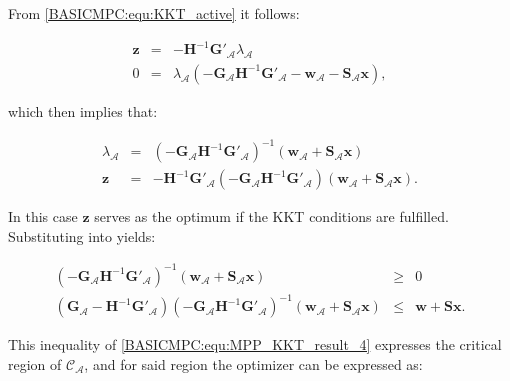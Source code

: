     From \ref{BASICMPC:equ:KKT_active} it follows:

    \begin{equation}
    \begin{array}{rcl}
            \textbf{z}&=&-\textbf{H}^{-1}\textbf{G}'_{\mathcal{A}}\lambda_{\mathcal{A}}\\
            0&=&\lambda_{\mathcal{A}}(-\textbf{G}_{\mathcal{A}}\textbf{H}^{-1}\textbf{G}'_{\mathcal{A}}-\textbf{w}_{\mathcal{A}}-\textbf{S}_{\mathcal{A}}\textbf{x}),
        \end{array}
        \label{BASICMPC:equ:MPP_KKT_result_2}
    \end{equation}

    which then implies that:

    \begin{equation}
    \begin{array}{rcl}
            \lambda_{\mathcal{A}}&=&(-\textbf{G}_{\mathcal{A}}\textbf{H}^{-1}\textbf{G}'_{\mathcal{A}})^{-1}(\textbf{w}_{\mathcal{A}}+\textbf{S}_{\mathcal{A}}\textbf{x})\\
            \textbf{z}&=&-\textbf{H}^{-1}\textbf{G}'_{\mathcal{A}}(-\textbf{G}_{\mathcal{A}}\textbf{H}^{-1}\textbf{G}'_{\mathcal{A}})(\textbf{w}_{\mathcal{A}}+\textbf{S}_{\mathcal{A}}\textbf{x}).
        \end{array}
        \label{BASICMPC:equ:MPP_KKT_result_3}
    \end{equation}

    In this case $\textbf{z}$ serves as the optimum if the KKT conditions are fulfilled. Substituting \label{BASICMPC:equ:KKT_active} into \label{BASICMPC:equ:MPP_KKT_result_3} yields:

    \begin{equation}
    \begin{array}{rcl}
            (-\textbf{G}_{\mathcal{A}}\textbf{H}^{-1}\textbf{G}'_{\mathcal{A}})^{-1}(\textbf{w}_{\mathcal{A}}+\textbf{S}_{\mathcal{A}}\textbf{x})
            &\geq&0\\
            (\textbf{G}_{\mathcal{A}}-\textbf{H}^{-1}\textbf{G}'_{\mathcal{A}})(-\textbf{G}_{\mathcal{A}}\textbf{H}^{-1}\textbf{G}'_{\mathcal{A}})^{-1}(\textbf{w}_{\mathcal{A}}+\textbf{S}_{\mathcal{A}}\textbf{x})
            &\leq&\textbf{w}+\textbf{Sx}.
            \end{array}
        \label{BASICMPC:equ:MPP_KKT_result_4}
    \end{equation}

    This inequality of \ref{BASICMPC:equ:MPP_KKT_result_4} expresses the critical region of $\mathcal{C}_{\mathcal{A}}$, and for said region the optimizer can be expressed as:

